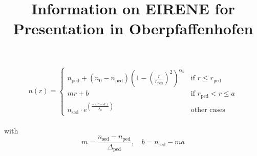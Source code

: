 \documentclass[tightpage]{standalone}
\title{Information on EIRENE for Presentation in Oberpfaffenhofen}
\begin{document}
	\begin{varwidth}{\linewidth}
	\begin{equation*}
		n(r) =
		\begin{cases}
			n_{\textrm{ped}} + (n_0 - n_{\textrm{ped}}) \left(1 - \left(\frac{r}{r_{\textrm{ped}}}\right)^2 \right)^{\alpha_n} & \textrm{if $r \le r_{\textrm{ped}}$}\\
			mr + b & \textrm{if $r_{\textrm{ped}} < r \le a$} \\
			n_{\textrm{sed}} \cdot e^{\left(\frac{-(r-a)}{\lambda_n}\right)} & \textrm{other cases}
		\end{cases}
	\end{equation*}
	~\\
	with\\
	\begin{equation*}
	m = \frac{n_{\textrm{sed}} - n_{\textrm{ped}}}{\Delta_{\textrm{ped}}}, \quad b = n_{\textrm{sed}} - ma
	\end{equation*}
	\end{varwidth}
\end{document}
